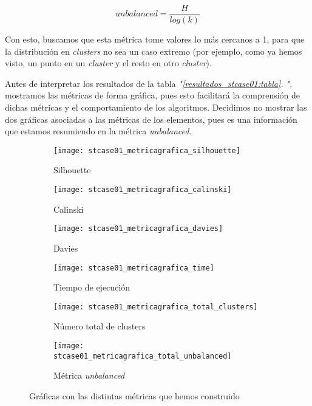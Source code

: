 \documentclass[11pt]{article}
\newcommand{\customcite}[1]{\emph{"\ref{#1}. \nameref{#1}"}}
\begin{document}
$$unbalanced = \frac{H}{log(k)}$$

Con esto, buscamos que esta métrica tome valores lo más cercanos a 1, para que la distribución en \emph{clusters} no sea un caso extremo (por ejemplo, como ya hemos visto, un punto en un \emph{cluster} y el resto en otro \emph{cluster}).

Antes de interpretar los resultados de la tabla \customcite{resultados_stcase01:tabla}, mostramos las métricas de forma gráfica, pues esto facilitará la comprensión de dichas métricas y el comportamiento de los algoritmos. Decidimos no mostrar las dos gráficas asociadas a las métricas de los elementos, pues es una información que estamos resumiendo en la métrica \emph{unbalanced}.

\begin{figure}[H]
    \centering

    \begin{subfigure}[b]{0.45 \textwidth}
        \texttt{[image: stcase01\_metricagrafica\_silhouette]}
        \caption{Silhouette}
    \end{subfigure}
    \begin{subfigure}[b]{0.45 \textwidth}
        \texttt{[image: stcase01\_metricagrafica\_calinski]}
        \caption{Calinski}
    \end{subfigure}

    \begin{subfigure}[b]{0.45 \textwidth}
        \texttt{[image: stcase01\_metricagrafica\_davies]}
        \caption{Davies}
    \end{subfigure}
    \begin{subfigure}[b]{0.45 \textwidth}
        \texttt{[image: stcase01\_metricagrafica\_time]}
        \caption{Tiempo de ejecución}
    \end{subfigure}

    \begin{subfigure}[b]{0.45 \textwidth}
        \texttt{[image: stcase01\_metricagrafica\_total\_clusters]}
        \caption{Número total de clusters}
    \end{subfigure}
    \begin{subfigure}[b]{0.45 \textwidth}
        \texttt{[image: stcase01\_metricagrafica\_total\_unbalanced]}
        \caption{Métrica \emph{unbalanced}}
    \end{subfigure}

    \caption{Gráficas con las distintas métricas que hemos construido}
    \label{stcase01_metricas_graficas:figure}
\end{figure}
\end{document}
